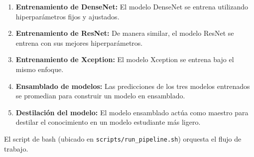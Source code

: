 \begin{enumerate}
    \item \textbf{Entrenamiento de DenseNet:} El modelo DenseNet se entrena utilizando hiperparámetros fijos y ajustados.
    \item \textbf{Entrenamiento de ResNet:} De manera similar, el modelo ResNet se entrena con sus mejores hiperparámetros.
    \item \textbf{Entrenamiento de Xception:} El modelo Xception se entrena bajo el mismo enfoque.
    \item \textbf{Ensamblado de modelos:} Las predicciones de los tres modelos entrenados se promedian para construir un modelo en ensamblado.
    \item \textbf{Destilación del modelo:} El modelo ensamblado actúa como maestro para destilar el conocimiento en un modelo estudiante más ligero.
\end{enumerate}

El script de bash (ubicado en \texttt{scripts/run\_pipeline.sh}) orquesta el flujo de trabajo.
